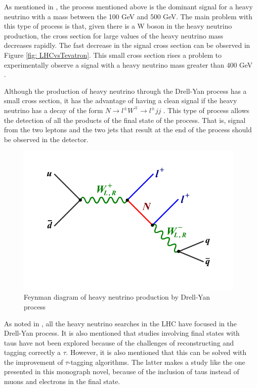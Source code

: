 As mentioned in \cite{HNDrell-Yan}, the process mentioned above is the dominant signal for a heavy neutrino with a mass between the 100 GeV and 500 GeV. The main problem with this type of process is that, given there is a W boson in the heavy neutrino production, the cross section for large values of the heavy neutrino mass decreases rapidly. The fast decrease in the signal cross section can be observed in Figure \ref{fig: LHCvsTevatron}. This small cross section rises a problem to experimentally observe a signal with a heavy neutrino mass greater than 400 GeV \cite{HNDrell-Yan}.

Although the production of heavy neutrino through the Drell-Yan process has a small cross section, it has the advantage of having a clean signal if the heavy neutrino has a decay of the form $N \rightarrow l^{\pm} W^{\mp} \rightarrow l^{\pm} jj$ \cite{HNDrell-Yan}. This type of process allows the detection of all the products of the final state of the process. That is, signal from the two leptons and the two jets that result at the end of the process should be observed in the detector. 

\begin{figure}[H]
\centering
\includegraphics[width=\linewidth]{Feynman_HN_DY}
\caption{Feynman diagram of heavy neutrino production by Drell-Yan process}
\label{fig: HN_DY}
\end{figure}

As noted in \cite{See-saw}, all the heavy neutrino searches in the LHC have focused in the Drell-Yan process. It is also mentioned that studies involving final states with taus have not been explored because of the challenges of reconstructing and tagging correctly a $\tau$. However, it is also mentioned that this can be solved with the improvement of $\tau$-tagging algorithms. The latter makes a study like the one presented in this monograph novel, because of the inclusion of taus instead of muons and electrons in the final state.   

